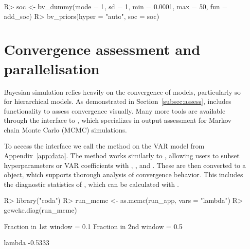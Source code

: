 \documentclass[article,nojss]{jss} %
\begin{document}
\begin{appendix}
\begin{Schunk}
\begin{Sinput}
R> soc <- bv_dummy(mode = 1, sd = 1, min = 0.0001, max = 50, fun = add_soc)
R> bv_priors(hyper = "auto", soc = soc)
\end{Sinput}
\end{Schunk}


\section{Convergence assessment and parallelisation} \label{app:conv}

Bayesian simulation relies heavily on the convergence of models, particularly so for hierarchical models. As demonstrated in Section~\ref{subsec:assess},  includes functionality to assess convergence visually. Many more tools are available through the interface to , which specializes in output assessment for Markov chain Monte Carlo (MCMC) simulations.

To access the interface we call the  method on the VAR model from Appendix~\ref{app:data}. The method works similarly to , allowing users to subset hyperparameters or VAR coefficients with , , and .
These are then converted to a  object, which supports thorough analysis of convergence behavior. This includes the diagnostic statistics of \cite{geweke1992}, which can be calculated with .

\begin{Schunk}
\begin{Sinput}
R> library("coda")
R> run_mcmc <- as.mcmc(run_app, vars = "lambda")
R> geweke.diag(run_mcmc)
\end{Sinput}
\begin{Soutput}
Fraction in 1st window = 0.1
Fraction in 2nd window = 0.5 

 lambda 
-0.5333 
\end{Soutput}
\end{Schunk}


\end{appendix}
\end{document}

